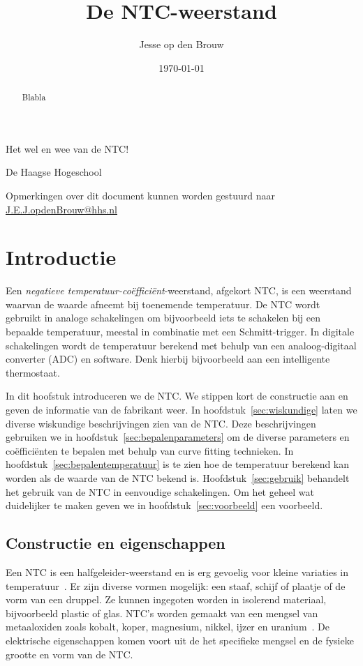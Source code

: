 \documentclass[12pt,a4paper,final,twoside,fleqn]{article}
\author{Jesse op den Brouw}
\title{De NTC-weerstand}
\date{\today}
\makeatletter
\def\maketitle{%
  \null
  \thispagestyle{empty}%
  \vskip 3cm
  \begin{center}\leavevmode
    {\LARGE \@title\par}%
    {\large \subtitle\par}%
    \vskip 1cm
    {\large \@author\par}%
    \vskip 0.03cm
    {\large De Haagse Hogeschool\par}%
    \vskip 0.03cm
    {\large \@date\par}%
  \end{center}%
  \vfill
  \null
}
\newcommand{\subtitle}{Het wel en wee van de NTC!}
\makeatother
\begin{document}
\raggedbottom
\setlength{\abovedisplayskip}{0cm}
\setlength{\belowdisplayskip}{2ex}

\maketitle
\begin{abstract}
\noindent
Blabla
\end{abstract}
\vspace*{2cm}

\clearpage
\tableofcontents
\clearpage
\listoffigures
\vspace{1cm}
\lstlistoflistings
\vfill
{\small
Opmerkingen over dit document kunnen worden gestuurd naar
\href{mailto:J.E.J.opdenBrouw@hhs.nl}{J.E.J.opdenBrouw@hhs.nl}
}
\clearpage


\section{Introductie}
Een \textsl{negatieve temperatuur-co\"effici\"ent}-weerstand, afgekort NTC,
is een weerstand waarvan de waarde afneemt bij toenemende temperatuur. De
NTC wordt gebruikt in analoge schakelingen om bijvoorbeeld iets te schakelen
bij een bepaalde temperatuur, meestal in combinatie met een Schmitt-trigger.
In digitale schakelingen wordt de temperatuur berekend met behulp van een
analoog-digitaal converter (ADC) en software. Denk hierbij bijvoorbeeld aan
een intelligente thermostaat.

In dit hoofstuk introduceren we de NTC. We stippen kort de constructie aan
en geven de informatie van de fabrikant weer. In hoofdstuk~\ref{sec:wiskundige}
laten we diverse wiskundige beschrijvingen zien van de NTC. Deze beschrijvingen
gebruiken we in hoofdstuk~\ref{sec:bepalenparameters}
om de diverse parameters en co\"effici\"enten te bepalen met behulp van curve
fitting technieken. In hoofdstuk~\ref{sec:bepalentemperatuur} is te zien hoe
de temperatuur berekend kan worden als de waarde van de NTC bekend is.
Hoofdstuk~\ref{sec:gebruik} behandelt het gebruik van de
NTC in eenvoudige schakelingen.
Om het geheel wat duidelijker te maken geven we in hoofdstuk~\ref{sec:voorbeeld}
een voorbeeld.

\subsection{Constructie en eigenschappen}
Een NTC is een halfgeleider-weerstand en is erg gevoelig voor kleine variaties
in temperatuur~\cite{jespersen1982thermal}. Er zijn diverse vormen mogelijk:
een staaf, schijf of plaatje of de vorm van een druppel. Ze kunnen ingegoten
worden in isolerend materiaal, bijvoorbeeld plastic of glas.
NTC's worden gemaakt van een mengsel van metaaloxiden zoals kobalt, koper,
magnesium, nikkel, ijzer en uranium~\cite{bakshi2009basic}. De elektrische
eigenschappen komen voort uit de het specifieke mengsel en de fysieke grootte
en vorm van de NTC.
\end{document}

